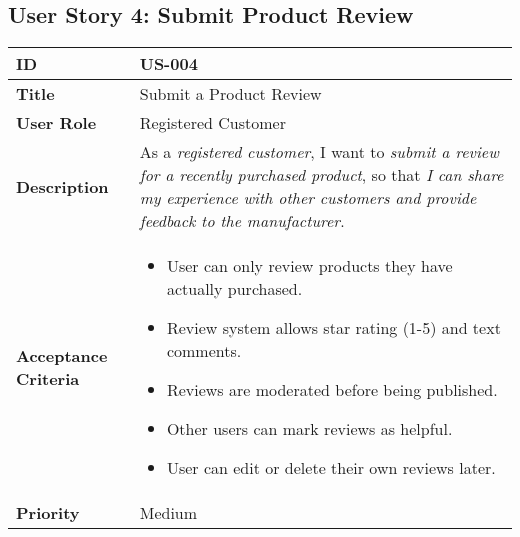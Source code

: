 \documentclass[a4paper,11pt]{article}
\begin{document}
\subsection{User Story 4: Submit Product Review}
\begin{tabularx}{\textwidth}{|l|X|}
\hline
\textbf{ID} & US-004 \\
\hline
\textbf{Title} & Submit a Product Review \\
\hline
\textbf{User Role} & Registered Customer \\
\hline
\textbf{Description} & As a \textit{registered customer}, I want to \textit{submit a review for a recently purchased product}, so that \textit{I can share my experience with other customers and provide feedback to the manufacturer}. \\
\hline
\textbf{Acceptance Criteria} &
\begin{itemize}[noitemsep, topsep=0pt]
    \item User can only review products they have actually purchased.
    \item Review system allows star rating (1-5) and text comments.
    \item Reviews are moderated before being published.
    \item Other users can mark reviews as helpful.
    \item User can edit or delete their own reviews later.
\end{itemize} \\
\hline
\textbf{Priority} & Medium \\
\hline
\end{tabularx}
\end{document}
